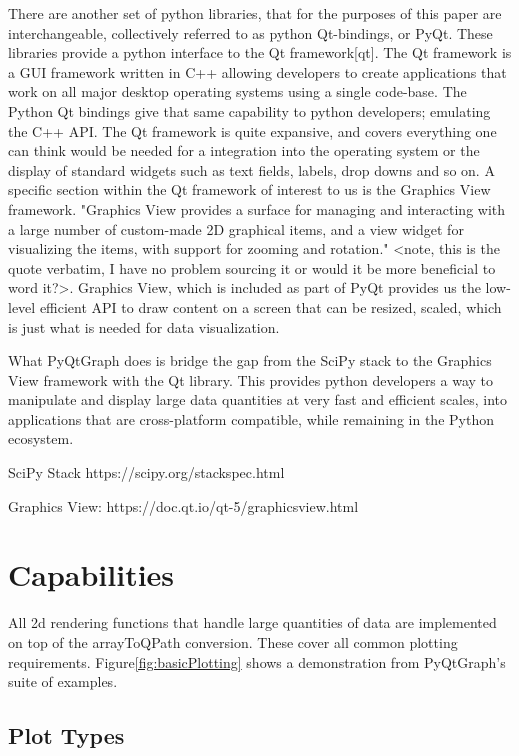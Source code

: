 \documentclass[journal]{vgtc}                %
\begin{document}
There are another set of python libraries, that for the purposes of this paper are interchangeable, collectively referred to as python Qt-bindings, or PyQt.  These libraries provide a python interface to the Qt framework[qt].  The Qt framework is a GUI framework written in C++ allowing developers to create applications that work on all major desktop operating systems using a single code-base.  The Python Qt bindings give that same capability to python developers; emulating the C++ API.  The Qt framework is quite expansive, and covers everything one can think would be needed for a integration into the operating system or the display of standard widgets such as text fields, labels, drop downs and so on.  A specific section within the Qt framework of interest to us is the Graphics View framework.  "Graphics View provides a surface for managing and interacting with a large number of custom-made 2D graphical items, and a view widget for visualizing the items, with support for zooming and rotation."  <note, this is the quote verbatim, I have no problem sourcing it or would it be more beneficial to word it?>. Graphics View, which is included as part of PyQt provides us the low-level efficient API to draw content on a screen that can be resized, scaled, which is just what is needed for data visualization.  

What PyQtGraph does is bridge the gap from the SciPy stack to the Graphics View framework with the Qt library.  This provides python developers a way to manipulate and display large data quantities at very fast and efficient scales, into applications that are cross-platform compatible, while remaining in the Python ecosystem.


SciPy Stack
https://scipy.org/stackspec.html

Graphics View:
https://doc.qt.io/qt-5/graphicsview.html

\section{Capabilities}

All 2d rendering functions that handle large quantities of data are implemented on top of the arrayToQPath conversion. These cover all common plotting requirements. Figure\ref{fig:basicPlotting} shows a demonstration from PyQtGraph's suite of examples.

\subsection{Plot Types}
\makeBasicPlottingFig
\end{document}
